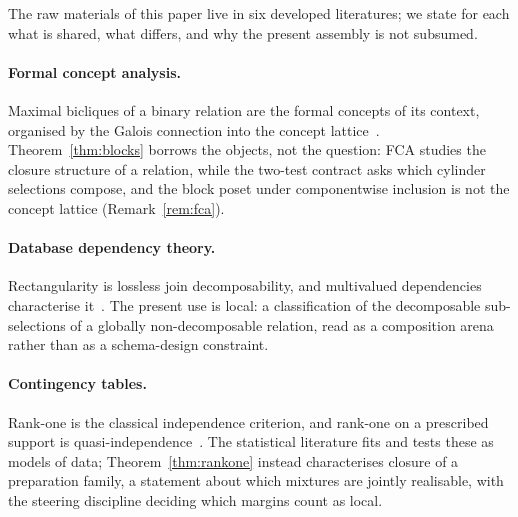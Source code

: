 \documentclass[11pt,a4paper]{article}
\begin{document}
    The raw materials of this paper live in six developed literatures; we state for each what is shared,
    what differs, and why the present assembly is not subsumed.

    \paragraph{Formal concept analysis.}
    Maximal bicliques of a binary relation are the formal concepts of its context, organised by the Galois
    connection into the concept lattice~\cite{GanterWille1999}.
    Theorem~\ref{thm:blocks} borrows the objects, not the question: FCA studies the closure structure of a
    relation, while the two-test contract asks which cylinder selections compose, and the block poset under
    componentwise inclusion is not the concept lattice (Remark~\ref{rem:fca}).

    \paragraph{Database dependency theory.}
    Rectangularity is lossless join decomposability, and multivalued dependencies characterise
    it~\cite{Fagin1977}.
    The present use is local: a classification of the decomposable sub-selections of a globally
    non-decomposable relation, read as a composition arena rather than as a schema-design constraint.

    \paragraph{Contingency tables.}
    Rank-one is the classical independence criterion, and rank-one on a prescribed support is
    quasi-independence~\cite{Goodman1968}.
    The statistical literature fits and tests these as models of data; Theorem~\ref{thm:rankone} instead
    characterises closure of a preparation family, a statement about which mixtures are jointly realisable,
    with the steering discipline deciding which margins count as local.
\end{document}
